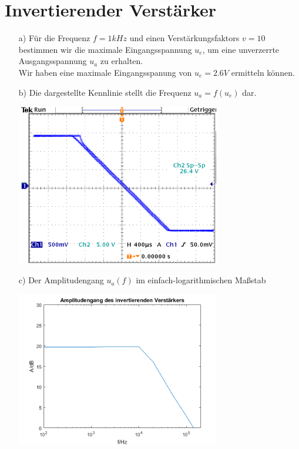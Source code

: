 \documentclass[11pt,a4paper,titlepage]{article}
\begin{document}
\section{Invertierender Verst\"arker}

\begin{itemize}
\item[a)] F\"ur die Frequenz $f=1kHz$ und einen Verst\"arkungsfaktors $v=10$ bestimmen wir die maximale Eingangsspannung $u_e$, um eine unverzerrte Ausgangsspannung $u_a$ zu erhalten. \\
Wir haben eine maximale Eingangsspanung von $u_e=2.6V$ ermitteln k\"onnen.
\item[b)] Die dargestellte Kennlinie stellt die Frequenz $u_a=f(u_e)$ dar. \\
\begin{center}
\includegraphics[width=0.7\textwidth]{8}
\end{center}
\item[c)] Der Amplitudengang $u_a(f)$ im einfach-logarithmischen Ma\ss{}stab \\
\begin{center}
\includegraphics[width=0.7\textwidth]{9}
\end{center}
\end{itemize}
\end{document}

